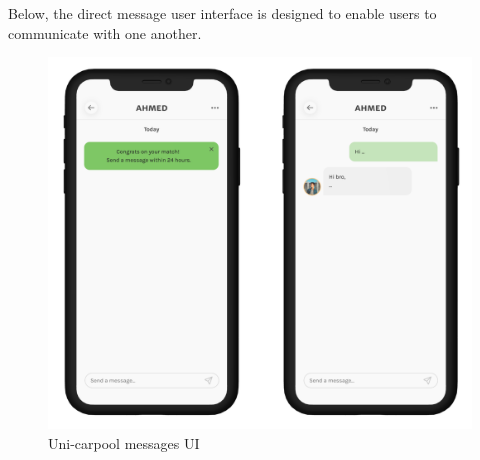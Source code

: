 Below, the direct message user interface is designed to enable users to communicate with one another.
\begin{figure}[H] 
            \centering
            \includegraphics[scale=0.2]{ui/unicarpool messaging.png}
            \caption{Uni-carpool messages UI} 
            \label{fig: messages UI}
\end{figure}

